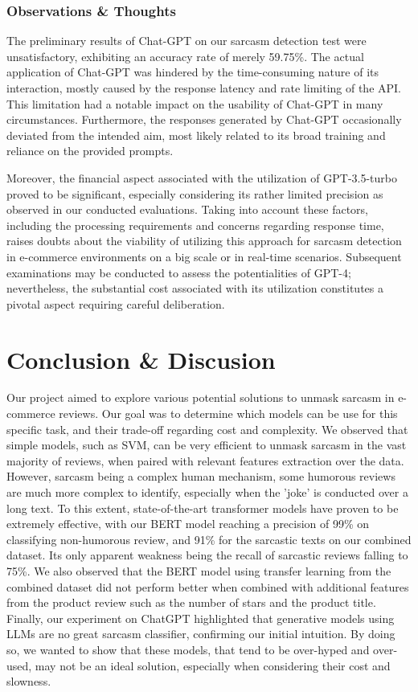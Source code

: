\documentclass[10pt,twocolumn,letterpaper]{article}
\begin{document}
\subsubsection{Observations \& Thoughts}
The preliminary results of Chat-GPT on our sarcasm detection test were unsatisfactory, exhibiting an accuracy rate of merely 59.75\%.
The actual application of Chat-GPT was hindered by the time-consuming nature of its interaction, mostly caused by the response latency and rate limiting of the API. This limitation had a notable impact on the usability of Chat-GPT in many circumstances.
Furthermore, the responses generated by Chat-GPT occasionally deviated from the intended aim, most likely related to its broad training and reliance on the provided prompts.

Moreover, the financial aspect associated with the utilization of GPT-3.5-turbo proved to be significant, especially considering its rather limited precision as observed in our conducted evaluations.
Taking into account these factors, including the processing requirements and concerns regarding response time, raises doubts about the viability of utilizing this approach for sarcasm detection in e-commerce environments on a big scale or in real-time scenarios.
Subsequent examinations may be conducted to assess the potentialities of GPT-4; nevertheless, the substantial cost associated with its utilization constitutes a pivotal aspect requiring careful deliberation.


\section{Conclusion \& Discusion}

Our project aimed to explore various potential solutions to unmask sarcasm in e-commerce reviews.
Our goal was to determine which models can be use for this specific task, and their trade-off regarding cost and complexity.
We observed that simple models, such as SVM, can be very efficient to unmask sarcasm in the vast majority of reviews, when paired with relevant features extraction over the data.
However, sarcasm being a complex human mechanism, some humorous reviews are much more complex to identify, especially when the 'joke' is conducted over a long text.
To this extent, state-of-the-art transformer models have proven to be extremely effective, with our BERT model reaching a precision of 99\% on classifying non-humorous review, and 91\% for the sarcastic texts on our combined dataset.
Its only apparent weakness being the recall of sarcastic reviews falling to 75\%.
We also observed that the BERT model using transfer learning from the combined dataset did not perform better when combined with additional features from the product review such as the number of stars and the product title.
Finally, our experiment on ChatGPT highlighted that generative models using LLMs are no great sarcasm classifier, confirming our initial intuition.
By doing so, we wanted to show that these models, that tend to be over-hyped and over-used, may not be an ideal solution, especially when considering their cost and slowness.
\end{document}

